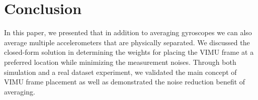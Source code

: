 \documentclass[conference]{IEEEtran}
\begin{document}





\section{Conclusion}

In this paper, we presented that in addition to averaging gyroscopes we can also average multiple accelerometers that are physically separated. We discussed the closed-form solution in determining the weights for placing the VIMU frame at a preferred location while minimizing the measurement noises. Through both simulation and a real dataset experiment, we validated the main concept of VIMU frame placement as well as demonstrated the noise reduction benefit of averaging.




\end{document}
